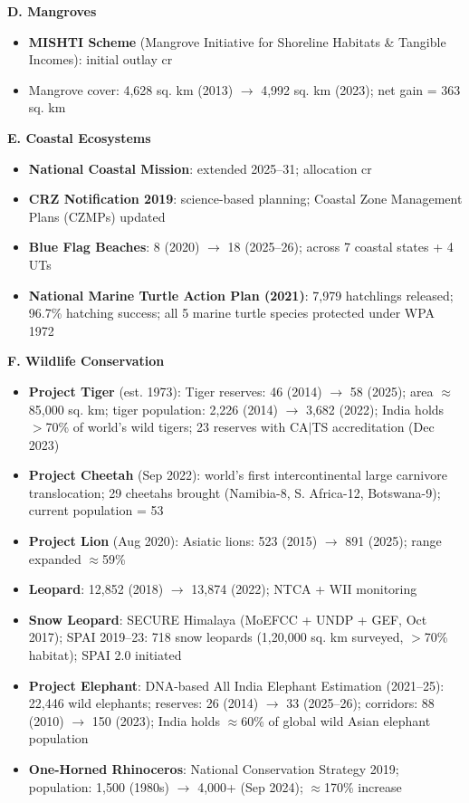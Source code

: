 \textbf{D. Mangroves}
\begin{itemize}
  \item \textbf{MISHTI Scheme} (Mangrove Initiative for Shoreline Habitats \& Tangible Incomes): initial outlay  cr
  \item Mangrove cover: 4,628 sq. km (2013) $\to$ 4,992 sq. km (2023); net gain = 363 sq. km
\end{itemize}

\textbf{E. Coastal Ecosystems}
\begin{itemize}
  \item \textbf{National Coastal Mission}: extended 2025--31; allocation  cr
  \item \textbf{CRZ Notification 2019}: science-based planning; Coastal Zone Management Plans (CZMPs) updated
  \item \textbf{Blue Flag Beaches}: 8 (2020) $\to$ 18 (2025--26); across 7 coastal states + 4 UTs
  \item \textbf{National Marine Turtle Action Plan (2021)}: 7,979 hatchlings released; 96.7\% hatching success; all 5 marine turtle species protected under WPA 1972
\end{itemize}

\textbf{F. Wildlife Conservation}
\begin{itemize}
  \item \textbf{Project Tiger} (est. 1973): Tiger reserves: 46 (2014) $\to$ 58 (2025); area $\approx$85,000 sq. km; tiger population: 2,226 (2014) $\to$ 3,682 (2022); India holds $>$70\% of world's wild tigers; 23 reserves with CA$|$TS accreditation (Dec 2023)
  \item \textbf{Project Cheetah} (Sep 2022): world's first intercontinental large carnivore translocation; 29 cheetahs brought (Namibia-8, S. Africa-12, Botswana-9); current population = 53
  \item \textbf{Project Lion} (Aug 2020): Asiatic lions: 523 (2015) $\to$ 891 (2025); range expanded $\approx$59\%
  \item \textbf{Leopard}: 12,852 (2018) $\to$ 13,874 (2022); NTCA + WII monitoring
  \item \textbf{Snow Leopard}: SECURE Himalaya (MoEFCC + UNDP + GEF, Oct 2017); SPAI 2019--23: 718 snow leopards (1,20,000 sq. km surveyed, $>$70\% habitat); SPAI 2.0 initiated
  \item \textbf{Project Elephant}: DNA-based All India Elephant Estimation (2021--25): 22,446 wild elephants; reserves: 26 (2014) $\to$ 33 (2025--26); corridors: 88 (2010) $\to$ 150 (2023); India holds $\approx$60\% of global wild Asian elephant population
  \item \textbf{One-Horned Rhinoceros}: National Conservation Strategy 2019; population: 1,500 (1980s) $\to$ 4,000+ (Sep 2024); $\approx$170\% increase
\end{itemize}

